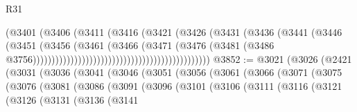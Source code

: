 \begin{lexlean}{R31}
\begin{coremodule}
                                                              (@3401
                                                                (@3406
                                                                  (@3411
                                                                    (@3416
                                                                      (@3421
                                                                        (@3426
                                                                          (@3431
                                                                            (@3436
                                                                              (@3441
                                                                                (@3446
                                                                                  (@3451
                                                                                    (@3456
                                                                                      (@3461
                                                                                        (@3466
                                                                                          (@3471
                                                                                            (@3476
                                                                                              (@3481
                                                                                                (@3486
                                                                                                  @3756)))))))))))))))))))))))))))))))))))))))))))))))
@3852 := @3021
    (@3026
      (@2421
        (@3031
          (@3036
            (@3041
              (@3046
                (@3051
                  (@3056
                    (@3061
                      (@3066
                        (@3071
                          (@3075
                            (@3076
                              (@3081
                                (@3086
                                  (@3091
                                    (@3096
                                      (@3101
                                        (@3106
                                          (@3111
                                            (@3116
                                              (@3121
                                                (@3126
                                                  (@3131
                                                    (@3136
                                                      (@3141

\end{coremodule}
\end{lexlean}
